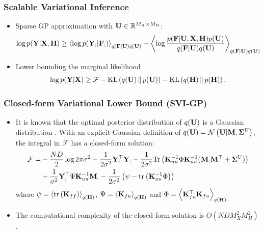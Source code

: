 \documentclass[aspectratio=169]{beamer}
\newcommand{\K}{\covarianceMatrix}
\newcommand{\yM}{\dataMatrix}
\newcommand{\fM}{\mappingFunctionMatrix}
\newcommand{\uM}{\inducingMatrix}
\newcommand{\xM}{\inputMatrix}
\newcommand{\mM}{\mathbf M}
\newcommand{\hM}{\mathbf H}
\newcommand{\sM}{\mathbf \Sigma}
\begin{document}
  \begin{frame}
    \frametitle{Scalable Variational Inference}
    \begin{itemize}
    \item Sparse GP approximation with $\uM \in \mathbb{R}^{M_X \times M_H}$:
    \begin{equation*}
\log p(\yM|\xM, \hM) \geq \expectationDist{\log p(\yM_:|\fM_:)}{q(\fM|\uM)q(\uM)} + 
\expectationDist{\log \frac{p(\fM|\uM, \xM, \hM)  p(\uM)}{q(\fM|\uM)q(\uM)}}{q(\fM|\uM)q(\uM)} 
\end{equation*}
   \item Lower bounding the marginal likelihood
   \begin{equation}
\log p(\yM|\xM) \geq  \mathcal{F} -\KL{q(\uM)}{p(\uM)} -\KL{q(\hM)}{p(\hM)},\label{eqn:lower_bound}
\end{equation}
  \end{itemize}
  \end{frame}
  
  \begin{frame}
    \frametitle{Closed-form Variational Lower Bound (SVI-GP)}
    \begin{itemize}
    \item It is known that the optimal posterior distribution of $q(\uM)$ is a Gaussian distribution \citep{Titsias2009, MatthewsEtAl2016}. With an explicit Gaussian definition of $q(\uM) = \gaussianDist{\uM}{\mM}{\sM^U}$, the integral in $\mathcal{F}$ has a closed-form solution:
\begin{align*}
\mathcal{F} = 
&-\frac{ND}{2}\log 2\pi \sigma^2 -\frac{1}{2\sigma^2} \yM_:^\top\yM_: -\frac{1}{2\sigma^2}\Tr\left(\K^{-1}_{uu} \Phi \K^{-1}_{uu} (\mM_{:}\mM_{:}^\top+\sM^{U}) \right)  \nonumber\\
&+\frac{1}{\sigma^2}\yM_:^\top \Psi \K^{-1}_{uu} \mM_{:}  -\frac{1}{2\sigma^2} \left( \psi -\tr{\K^{-1}_{uu} \Phi} \right) \label{eqn:F_3}
\end{align*}
where $\psi = \expectationDist{\tr{\K_{ff}}}{q(\hM)}$, $\Psi = \expectationDist{\K_{fu}}{q(\hM)}$ and $\Phi = \expectationDist{\K_{fu}^\top\K_{fu}}{q(\hM)}$
\item The computational complexity of the closed-form solution is $O(NDM_X^2M_H^2)$.
  \end{itemize}
  \end{frame}
  
\end{document}
